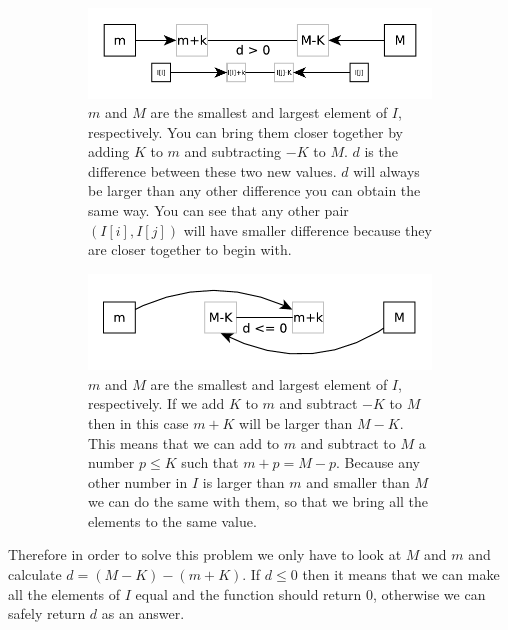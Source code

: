 \begin{figure}
	\vspace*{-0.5in}
	\centering
	\begin{subfigure}[t]{0.90\textwidth}
		\includegraphics[width=\textwidth]{sources/smallest_range/images/explanation1} 
		\caption{$m$ and $M$ are the smallest and largest element of $I$, respectively. You can
		bring them closer together by adding $K$ to $m$ and subtracting $-K$ to $M$. $d$ is the
		difference between these two new values. $d$ will always be larger than any other difference
		you can obtain the same way. You can see that any other pair $(I[i], I[j])$ will have
		smaller difference because they are closer together to begin with.}
		\label{fig:smallest_range:explanation1} 
	 \end{subfigure}
	\hfill
	\begin{subfigure}[t]{0.90\textwidth}
		\includegraphics[width=\textwidth]{sources/smallest_range/images/explanation2} 
		\caption{$m$ and $M$ are the smallest and largest element of $I$, respectively. If we  add
		$K$ to $m$ and subtract $-K$ to $M$ then in this case $m+K$ will be larger than $M-K$. This
		means that we can add to $m$ and subtract to $M$ a number $p \leq K$ such that $m+p = M-p$.
		Because any other number in $I$ is larger than $m$ and smaller than $M$ we can do the same
		with them, so that we bring all the elements to the same value.}
		\label{fig:smallest_range:explanation2} 
	 \end{subfigure}
	 \hfill
	 \label{}
	 \caption{}
\end{figure}
Therefore in order to solve this problem we only have to look at $M$ and $m$ and calculate
$d=(M-K)-(m+K)$. If $d \leq 0$ then it means that we can make all the elements of $I$ equal and the
function should return $0$, otherwise we can safely return $d$ as an answer.

